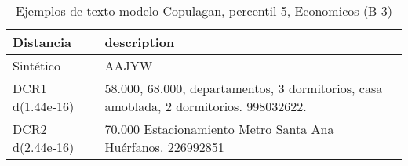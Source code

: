 \begin{table}[H]
\centering
\fontsize{10}{14}\selectfont
\caption{Ejemplos de texto modelo Copulagan, percentil 5, Economicos (B-3)}
\label{table-example-economicos-b-3-copulagan-5p-text}
\begin{tabular}{|l|m{35em}|}
\hline
\rowcolor[gray]{0.8}
Distancia & description \\
\hline Sintético & AAJYW \\
\hline DCR1 d(1.44e-16) & 58.000, 68.000, departamentos, 3 dormitorios, casa amoblada, 2 dormitorios. 998032622. \\
\hline DCR2 d(2.44e-16) & 70.000 Estacionamiento Metro Santa Ana Hu\'erfanos. 226992851 \\
\hline
\end{tabular}
\end{table}
